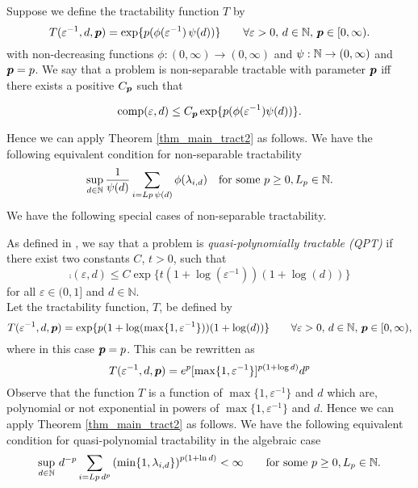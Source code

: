 \documentclass[11pt,a4paper]{article}
\begin{document}
\begin{example}
    Suppose we define the tractability function $T$ by
\[
 T(\varepsilon^{-1},d,\boldsymbol{p})= \exp\{p(\phi(\varepsilon^{-1})\, \psi(d))\}
 \qquad \forall \varepsilon > 0, \,  d \in \mathbb{N}, \, \boldsymbol{p}\in [0,\infty).
\]  with non-decreasing functions $\phi : (0,\infty) \to (0,\infty)$ and $\psi : \mathbb{N} \to (0,\infty)$ and $\boldsymbol{p} = p$. 
We say that a problem is non-separable tractable with parameter $\boldsymbol{p}$ iff there exists a positive $C_{\boldsymbol{p}}$ such that

\[\operatorname{comp}(\varepsilon,d) \leq  C_{\boldsymbol{p}}\exp\{p(\phi(\varepsilon^{-1})\psi(d))\}.\]

Hence we can apply Theorem \ref{thm_main_tract2} as follows. We have the following equivalent condition for non-separable tractability
\[
\sup_{d\in\mathbb{N}}\frac{1}{\psi(d)}\sum_{i=Lp\,\psi(d)} \phi(\lambda_{i,d})\quad \text{for some } p \geq 0, L_p \in \mathbb{N}.
\]
We have the following special cases of non-separable tractability. \end{example}
\begin{example} 

As defined in \cite{GW11}, we say that a problem is \emph{quasi-polynomially tractable (QPT)} if there exist two constants $C$, $t > 0$, such that
\begin{equation}\label{expqpt}
    \comp(\varepsilon,d) \leq C\exp\{t(1+\log(\varepsilon^{-1}))(1+\log(d))\}
\end{equation}
for all $\varepsilon \in (0,1]$ and $d\in\mathbb{N}$.\\

\noindent Let the tractability function, $T$,
be defined by
\[
 T(\varepsilon^{-1},d,\boldsymbol{p})= \exp\{p(1+\log(\max\{1,\varepsilon^{-1}\}))(1+\log (d))\}  \qquad \forall \varepsilon > 0, \,  d \in \mathbb{N}, \, \boldsymbol{p} \in [0,\infty),
\] where in this case $\boldsymbol{p} = p$. This can be rewritten as 
\[
T(\varepsilon^{-1},d,\boldsymbol{p}) = e^p[\max\{1,\varepsilon^{-1}\}]^{p(1+\log d)}d^p
\]
Observe that the function $T$ is a function of $\max\{1,\varepsilon^{-1}\}$ and $d$ which are, polynomial or not exponential in powers of $\max\{1,\varepsilon^{-1}\}$ and $d$. Hence we can apply Theorem \ref{thm_main_tract2} as follows. We have the following equivalent condition for quasi-polynomial tractability in the algebraic case
\[
\sup_{d\in\mathbb{N}}\,d^{-p}\sum_{i=Lp\,d^{p}} \left(\min\{1,\lambda_{i,d}\} \right)^{p(1+\ln d)} < \infty \qquad \text{for some } p \geq 0, L_p \in \mathbb{N}.\]
\end{example}
\end{document}
